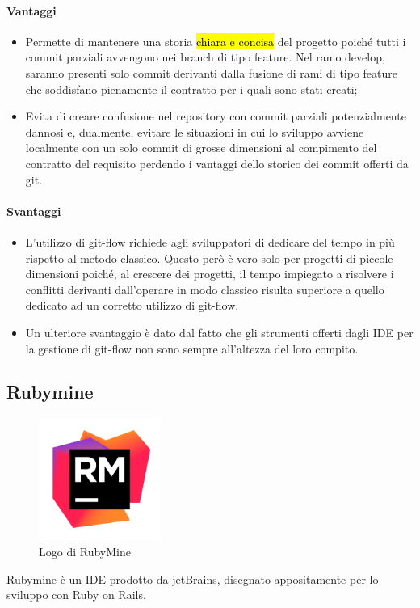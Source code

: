 \paragraph{Vantaggi} 
\begin{itemize}
	\item Permette di mantenere una storia \hl{chiara e concisa} del progetto poiché tutti i commit parziali avvengono nei branch di tipo feature.  Nel ramo develop, saranno presenti solo commit derivanti dalla fusione di rami di tipo feature che soddisfano pienamente il contratto per i quali sono stati creati;
	\item Evita di creare confusione nel repository con commit parziali potenzialmente dannosi e, dualmente, evitare le situazioni in cui lo sviluppo avviene localmente con un solo commit di grosse dimensioni al compimento del contratto del requisito perdendo i vantaggi dello storico dei commit offerti da git.
\end{itemize}
\paragraph{Svantaggi}
\begin{itemize}
	\item L'utilizzo di git-flow richiede agli sviluppatori di dedicare del tempo in più rispetto al metodo classico. Questo però è vero solo per progetti di piccole dimensioni poiché, al crescere dei progetti, il tempo impiegato a risolvere i conflitti derivanti dall'operare in modo classico risulta superiore a quello dedicato ad un corretto utilizzo di git-flow.
	\item Un ulteriore svantaggio è dato dal fatto che gli strumenti offerti dagli IDE per la gestione di git-flow non sono sempre all'altezza del loro compito.
\end{itemize}

\subsection{Rubymine}

\begin{figure}[H]
\begin{center}
\includegraphics[width=4cm]{Pics/rubymine_logo.png}
\caption{Logo di RubyMine}
\label{fig:RubyMine}
\end{center}
\end{figure}
Rubymine è un IDE prodotto da jetBrains, disegnato appositamente per lo sviluppo con Ruby on Rails.

